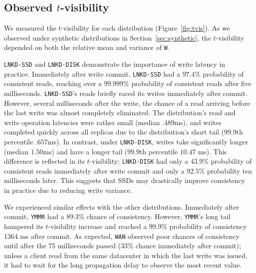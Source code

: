 \documentclass{vldb}
\newcommand{\subsectionskip}{-0em}
\begin{document}
\vspace{\subsectionskip}\subsection{Observed {\large$t$}-visibility}

We measured the $t$-visibility for each distribution
(Figure~\ref{fig:tvis}). As we observed under synthetic distributions
in Section~\ref{sec:synthetic}, the $t$-visibility depended on both
the relative mean and variance of \texttt{W}.

\texttt{LNKD-SSD} and \texttt{LNKD-DISK} demonstrate the importance of
write latency in practice.  Immediately after write commit,
\texttt{LNKD-SSD} had a $97.4\%$ probability of consistent reads,
reaching over a $99.999\%$ probability of consistent reads after five
milliseconds. \texttt{LNKD-SSD}'s reads briefly raced its writes
immediately after commit.  However, several milliseconds after the
write, the chance of a read arriving before the last write was almost
completely eliminated. The distribution's read and write operation
latencies were rather small (median $.489$ms), and writes completed
quickly across all replicas due to the distribution's short tail
($99.9$th percentile $.657$ms).  In contrast, under
\texttt{LNKD-DISK}, writes take significantly longer (median $1.50$ms)
and have a longer tail ($99.9$th percentile $10.47$ ms).  This
difference is reflected in its $t$-visibility: \texttt{LNKD-DISK} had
only a $43.9\%$ probability of consistent reads immediately after
write commit and only a $92.5\%$ probability ten milliseconds later.
This suggests that SSDs may drastically improve consistency in
practice due to reducing write variance.

We experienced similar effects with the other distributions.
Immediately after commit, \texttt{YMMR} had a $89.3\%$ chance of
consistency.  However, \texttt{YMMR}'s long tail hampered its
$t$-visibility increase and reached a $99.9\%$ probability of
consistency 1364 ms after commit.  As expected, \texttt{WAN} observed
poor chances of consistency until after the 75 milliseconds passed
($33\%$ chance immediately after commit); unless a client read from
the same datacenter in which the last write was issued, it had to wait
for the long propagation delay to observe the most recent value.
\end{document}
